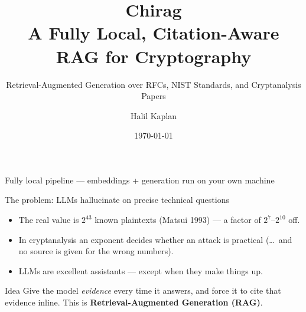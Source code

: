 \documentclass[aspectratio=169]{beamer}
\title[Chirag]{\textbf{Chirag}\\ \large A Fully Local, Citation-Aware RAG
  for Cryptography}
\subtitle{\normalsize Retrieval-Augmented Generation over RFCs, NIST
  Standards, and Cryptanalysis Papers}
\author[Kaplan]{Halil Kaplan}
\date{\today}
\begin{document}
\begin{frame}
  \titlepage
  \begin{center}
    \scriptsize
    Fully local pipeline --- embeddings + generation run on your own machine
  \end{center}
\end{frame}

\begin{frame}{The problem: LLMs hallucinate on precise technical questions}
  \vspace{2mm}

  \begin{itemize}
    \item The real value is $2^{43}$ known plaintexts (Matsui 1993) --- a
          factor of $2^7$--$2^{10}$ off.
    \item In cryptanalysis an exponent decides whether an attack is practical
      \;(\dots\ and no source is given for the wrong numbers).
    \item LLMs are excellent assistants --- except when they make things up.
  \end{itemize}
  \pause
  \begin{block}{Idea}
    Give the model \emph{evidence} every time it answers, and force it to
    cite that evidence inline. This is \textbf{Retrieval-Augmented
    Generation (RAG)}.
  \end{block}
\end{frame}
\end{document}
